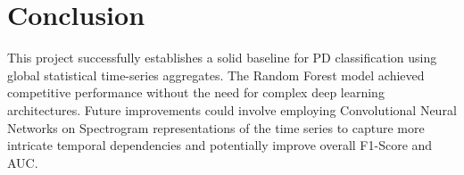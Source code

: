 \documentclass{article}
\begin{document}
\section{Conclusion}
This project successfully establishes a solid baseline for PD classification using global statistical time-series aggregates. The Random Forest model achieved competitive performance without the need for complex deep learning architectures. Future improvements could involve employing Convolutional Neural Networks on Spectrogram representations of the time series to capture more intricate temporal dependencies and potentially improve overall F1-Score and AUC.
\end{document}

